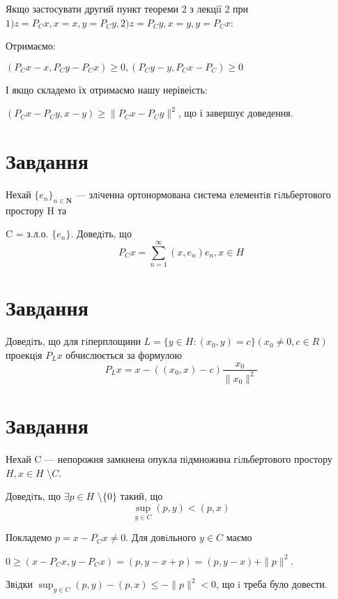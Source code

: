 \documentclass[a4paper, 14pt]{extreport}
\def\s{\displaystyle\sup_{y \in C}}
\begin{document}
    Якщо застосувати другий пункт теореми 2 з лекції 2 
    при $1)z = P_Cx, x = x, y = P_Cy, 2)z = P_Cy, x = y, y = P_Cx $:


    Отримаємо:


    $ (P_Cx - x, P_Cy - P_Cx) \geq 0 , (P_Cy - y, P_Cx - P_C) \geq 0$


    І якщо складемо їх отримаємо нашу нерівеість:


    $(P_Cx - P_Cy, x - y) \geq \|P_Cx - P_Cy \|^2  $, що і завершує доведення.



    \chapter{Завдання \theHchapter}


    \begin{tcolorbox}[title=Завдання]
        Нехай $\{e_n\}_{n \in \mathbf{N}} $ — злiченна ортонормована система елементiв 
        гiльбертового простору H та
        
        
        C = з.л.о. $\{e_n\}$. Доведiть, що
        $$ P_Cx = \sum_{n = 1}^{\infty}(x, e_n)e_n, x \in H $$
    \end{tcolorbox}





    \chapter{Завдання \theHchapter}


    \begin{tcolorbox}[title=Завдання]
        
        Доведiть, що для гiперплощини 
        $ L = \{y \in H : (x_0, y) = c\} (x_0 \neq 0, c \in R)$
        проекцiя $P_Lx$ обчислюється за формулою
        $$ P_Lx = x - ((x_0, x) - c) \frac{x_0}{\| x_0 \| ^ 2} $$
        
    \end{tcolorbox}



    \chapter{Завдання \theHchapter}


    \begin{tcolorbox}[title=Завдання]
        
        Нехай C — непорожня замкнена опукла пiдмножина гiльбертового 
        простору $ H, x \in H $ \textbackslash $C $.
        
        
        Доведiть, що $ \exists p \in H$ \textbackslash $\{0\} $ такий, що
        $$ \s (p, y) < (p, x) $$

        
    \end{tcolorbox}



    Покладемо $p = x - P_C x \neq 0$. Для довiльного $y \in C$ маємо


    $0 \geq (x - P_C x, y - P_C x)=(p, y - x + p)=(p, y - x) + \|p\| ^2$.
    

    Звiдки $ \s (p, y) - (p, x) \le - \|p\| ^ 2 < 0 $,
    що i треба було довести.
\end{document}
